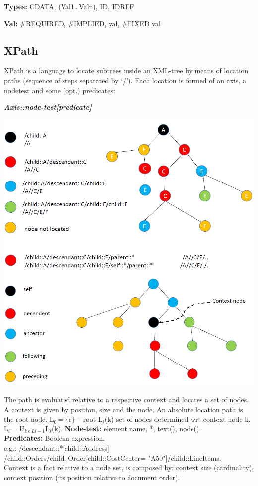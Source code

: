 \documentclass{article}
\begin{document}
\textbf{ Types: }CDATA, (Val1{\textbar}{\dots}{\textbar}Valn), ID, IDREF

\textbf{ Val: }\#REQUIRED, \#IMPLIED, val, \#FIXED val

\subsection{XPath}

XPath is a language to locate subtrees inside an XML-tree by means of location paths (sequence of steps separated by `/'). Each location is formed of an axis, a nodetest and some (opt.) predicates:

\textbf{\textit{Axis::node-test[predicate]}}\\
\begin{center}
\includegraphics[scale = 0.5]{image2.png}
\includegraphics[scale = 0.5]{image3.png}
\end{center}
The path is evaluated relative to a respective context and locates a set of nodes. A context is given by position, size and the node. An absolute location path is the root node.
L${}_{0\ }$= $\mathrm{\{}$r$\mathrm{\}}$ -- root
L${}_{i}$(k) set of nodes determined wrt context node k.
L${}_{i\ }$= U${}_{k\ e\ Li-1}$L${}_{i}$(k).
\textbf{Node-test: }element name, *, text(), node().\\
\textbf{Predicates: }Boolean expression.\\
e.g.: /descendant::*[child::Address]\\
/child::Orders/child::Order[child::CostCenter= "A50"]/child::LineItems.\\
Context is a fact relative to a node set, is composed by: context size (cardinality), context position (its position relative to document order).
\end{document}
